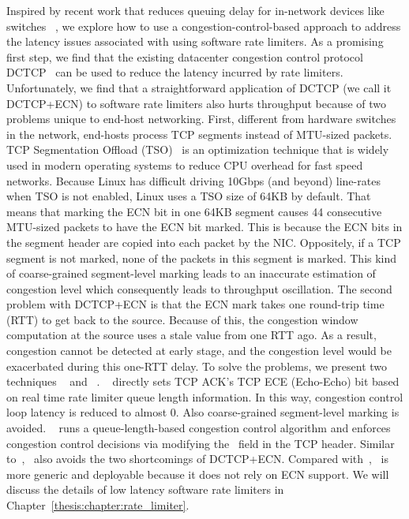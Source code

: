 Inspired by recent work that reduces queuing delay for in-network
devices like switches ~\cite{alizadeh2010data,he2016ac,mittal2015timely,zhu2015congestion}, we explore how to
use a congestion-control-based approach to address the latency issues
associated with using software rate limiters.  As a promising first
step, we find that the existing datacenter congestion control protocol
DCTCP~\cite{alizadeh2010data} can be used to reduce the latency incurred
by rate limiters. Unfortunately, we find that a straightforward
application of DCTCP (we call it DCTCP+ECN) to software rate limiters also hurts throughput because of 
two problems unique to end-host networking. First, different from hardware switches in the
network, end-hosts process TCP segments instead of MTU-sized packets.
TCP Segmentation Offload (TSO)~\cite{tcp-segment-offload} is an
optimization technique that is widely used in modern operating systems
to reduce CPU overhead for fast speed networks. Because Linux has
difficult driving 10Gbps (and beyond) line-rates when TSO is not
enabled, Linux uses a TSO size of 64KB by default. That means that
marking the ECN bit in one 64KB segment causes 44 consecutive MTU-sized
packets to have the ECN bit marked. This is because the ECN bits in the
segment header are copied into each packet by the NIC. Oppositely, if a
TCP segment is not marked, none of the packets in this segment is
marked. This kind of coarse-grained segment-level marking leads to an
inaccurate estimation of congestion level which consequently leads to
throughput oscillation.
The second problem with DCTCP+ECN is that the ECN mark takes one
round-trip time (RTT) to get back to the source.  Because of this, the
congestion window computation at the source uses a stale value from one
RTT ago. As a result, congestion cannot be detected at early stage, and
the congestion level would be exacerbated during this one-RTT delay.
To solve the problems, we present two techniques \textemdash\xspace~\dem{} and ~\spring{}.
~\dem{} directly sets TCP ACK's TCP ECE (Echo-Echo) bit based on real time rate limiter queue length information.
In this way, congestion control loop latency is reduced to almost 0. Also coarse-grained segment-level marking is avoided.
~\spring{} runs a queue-length-based congestion control algorithm and enforces congestion control decisions via modifying
the~\rwnd{} field in the TCP header. Similar to~\dem{},~\spring{} also avoids the two shortcomings of DCTCP+ECN. 
Compared with~\dem{},~\spring{}
is more generic and deployable because it does not rely on ECN support.
We will discuss the details of low latency software rate limiters in Chapter~\ref{thesis:chapter:rate_limiter}.

